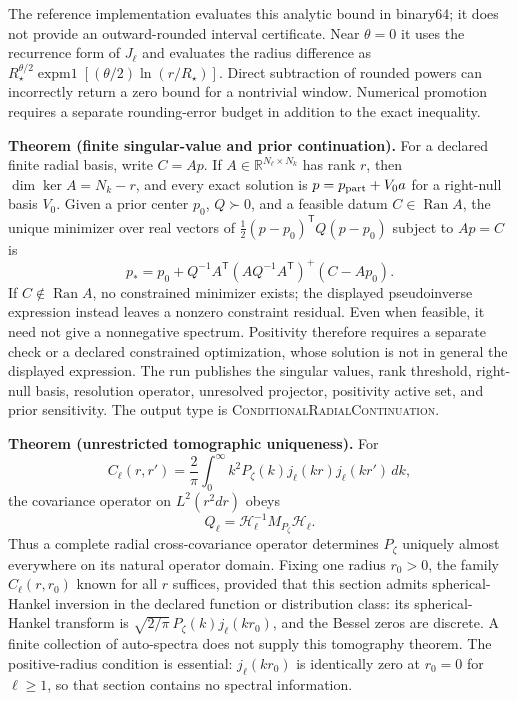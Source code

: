 The reference implementation evaluates this analytic bound in binary64; it
does not provide an outward-rounded interval certificate. Near $\theta=0$ it
uses the recurrence form of $J_\ell$ and evaluates the radius difference as
$R_\star^{\theta/2}\operatorname{expm1}[(\theta/2)\ln(r/R_\star)]$.
Direct subtraction of rounded powers can incorrectly return a zero bound for
a nontrivial window. Numerical promotion requires a separate rounding-error
budget in addition to the exact inequality.

\textbf{Theorem (finite singular-value and prior continuation).}
\label{thm:oph330-finite-prior-continuation}
For a declared finite radial basis, write \(C=Ap\). If
\(A\in\mathbb R^{N_\ell\times N_k}\) has rank \(r\), then
\(\dim\ker A=N_k-r\), and every exact solution is
\(p=p_{\rm part}+V_0a\) for a right-null basis \(V_0\). Given a prior center
\(p_0\), \(Q\succ0\), and a feasible datum \(C\in\operatorname{Ran}A\),
the unique minimizer over real vectors of
\(\frac12(p-p_0)^{\mathsf T}Q(p-p_0)\) subject to \(Ap=C\) is
\[
\boxed{
p_*=p_0+Q^{-1}A^{\mathsf T}
(AQ^{-1}A^{\mathsf T})^+(C-Ap_0).}
\]
If $C\notin\operatorname{Ran}A$, no constrained minimizer exists; the displayed
pseudoinverse expression instead leaves a nonzero constraint residual. Even
when feasible, it need not give a nonnegative spectrum. Positivity therefore
requires a separate check or a declared constrained optimization, whose
solution is not in general the displayed expression.
The run publishes the singular values, rank threshold, right-null basis,
resolution operator, unresolved projector, positivity active set, and prior
sensitivity. The output type is \textsc{ConditionalRadialContinuation}.

\textbf{Theorem (unrestricted tomographic uniqueness).}
\label{thm:oph330-radial-tomography}
For
\[
 C_\ell(r,r')=\frac2\pi\int_0^\infty k^2P_\zeta(k)
 j_\ell(kr)j_\ell(kr')\,dk,
\]
the covariance operator on $L^2(r^2dr)$ obeys
\[
 Q_\ell=\mathcal H_\ell^{-1}M_{P_\zeta}\mathcal H_\ell.
\]
Thus a complete radial cross-covariance operator determines $P_\zeta$ uniquely
almost everywhere on its natural operator domain. Fixing one radius $r_0>0$,
the family $C_\ell(r,r_0)$ known for all $r$ suffices, provided that this
section admits spherical-Hankel inversion in the declared function or
distribution class: its spherical-Hankel transform is
$\sqrt{2/\pi}\,P_\zeta(k)j_\ell(kr_0)$, and the Bessel zeros are discrete.
A finite collection of auto-spectra does not supply this tomography theorem.
The positive-radius condition is essential: $j_\ell(kr_0)$ is identically zero
at $r_0=0$ for $\ell\ge1$, so that section contains no spectral information.

